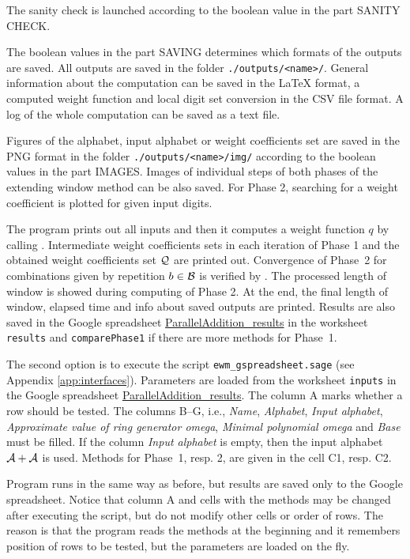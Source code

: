 The sanity check is launched according to the boolean value in the part SANITY CHECK. 

The boolean values in the part SAVING determines which formats of the outputs are saved. All outputs are saved in the folder \verb+./outputs/<name>/+. General information about the computation can be saved in the \LaTeX{} format, a computed weight function and local digit set conversion in the CSV file format.  A log of the whole computation can be saved as a text file.

Figures of the alphabet, input alphabet or weight coefficients set are saved in the PNG format in the folder \verb+./outputs/<name>/img/+ according to the boolean values in the part IMAGES. Images of individual steps of both phases of the extending window method can be also saved. For Phase 2, searching for a weight coefficient  is plotted for given input digits.  

The program prints out all inputs and then it computes a weight function $q$ by calling . Intermediate weight coefficients sets in each iteration of Phase 1 and the obtained weight coefficients set $\mathcal{Q}$ are printed out. Convergence of Phase~2 for combinations given by repetition $b\in\mathcal{B}$ is verified by . The processed length of window is showed during computing of Phase 2. At the end, the final length of window, elapsed time and info about saved outputs are printed. Results are also saved in the Google spreadsheet \href{https://docs.google.com/spreadsheets/d/1TnhrHdefHfHa0WSeVs4q6XVj3epjPlPlnoekE0E1xeM/edit?usp=sharing}{ParallelAddition\_results} in the worksheet \verb+results+ and \verb+comparePhase1+ if there are more methods for Phase~1.

The second option is to execute the script \verb+ewm_gspreadsheet.sage+ (see Appendix \ref{app:interfaces}). Parameters are loaded from the worksheet \verb+inputs+ in the Google spreadsheet \href{https://docs.google.com/spreadsheets/d/1TnhrHdefHfHa0WSeVs4q6XVj3epjPlPlnoekE0E1xeM/edit?usp=sharing}{ParallelAddition\_results}. The column A marks whether a row should be tested. The columns B--G, i.e., \emph{Name}, \emph{Alphabet}, \emph{Input alphabet}, \emph{Approximate value of ring generator omega}, \emph{Minimal polynomial omega} and \emph{Base} must be filled. If the column \emph{Input alphabet} is empty, then the input alphabet $\mathcal{A}+\mathcal{A}$ is used. Methods for Phase~1, resp. 2, are given in the cell C1, resp. C2.

Program runs in the same way as before, but results are saved only to the Google spreadsheet. Notice that column A and cells with the methods may be changed  after executing the script, but do not modify other cells or order of rows. The reason is that the program reads the methods at the beginning and it remembers position of rows to be tested, but the parameters are loaded on the fly.

